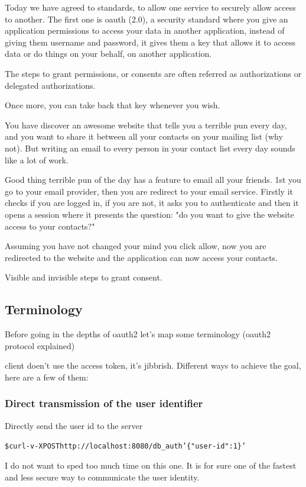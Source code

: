 \documentclass[11pt]{style}
\begin{document}
Today we have agreed to standards, to allow one service to securely allow access
to another.
The first one is oauth (2.0), a security standard where you give an application
permissions to access your data in another application, instead of giving them
username and password, it gives them a key that allows it to access data or do
things on your behalf, on another application.

The steps to grant permissions, or consents are often referred as authorizations
or delegated authorizations.

Once more, you can take back that key whenever you wish.

You have discover an awesome website that tells you a terrible pun every day,
and you want to share it between all your contacts on your mailing list (why
not).
But writing an email to every person in your contact list every day sounds like
a lot of work.

Good thing terrible pun of the day has a feature to email all your friends.
1st you go to your email provider, then you are redirect to your email service.
Firstly it checks if you are logged in, if you are not, it asks you to
authenticate and then it opens a session where it presents the question: "do you
want to give the website access to your contacts?"

Assuming you have not changed your mind you click allow, now you are redirected
to the website and the application can now access your contacts.

Visible and invisible steps to grant consent.
\subsection{Terminology}
Before going in the depths of oauth2 let's map some terminology
(oauth2 protocol explained)

client doen't use the access token, it's jibbrish.
Different ways to achieve the goal, here are a few of them:
\subsubsection{Direct transmission of the user identifier}
Directly send the user id to the server
\begin{alltt}
    \$ curl -v -X POST http://localhost:8080/db_auth '\{"user-id": 1\}'
\end{alltt}
I do not want to sped too much time on this one. It is for sure one of the
fastest
and less secure way to communicate the user identity.
\end{document}
